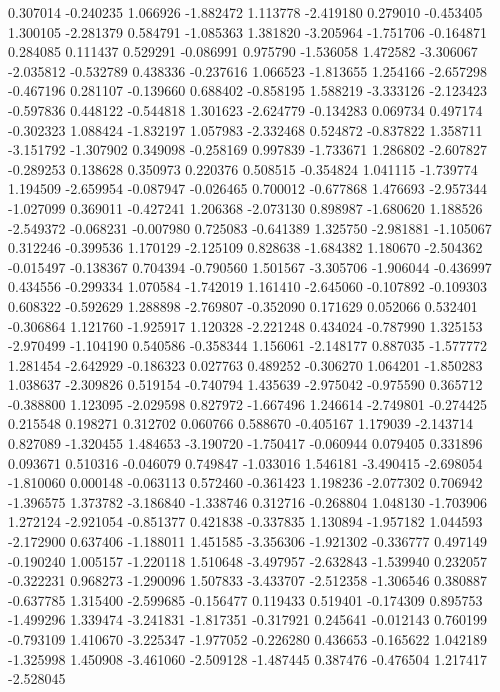 0.307014
-0.240235
1.066926
-1.882472
1.113778
-2.419180
0.279010
-0.453405
1.300105
-2.281379
0.584791
-1.085363
1.381820
-3.205964
-1.751706
-0.164871
0.284085
0.111437
0.529291
-0.086991
0.975790
-1.536058
1.472582
-3.306067
-2.035812
-0.532789
0.438336
-0.237616
1.066523
-1.813655
1.254166
-2.657298
-0.467196
0.281107
-0.139660
0.688402
-0.858195
1.588219
-3.333126
-2.123423
-0.597836
0.448122
-0.544818
1.301623
-2.624779
-0.134283
0.069734
0.497174
-0.302323
1.088424
-1.832197
1.057983
-2.332468
0.524872
-0.837822
1.358711
-3.151792
-1.307902
0.349098
-0.258169
0.997839
-1.733671
1.286802
-2.607827
-0.289253
0.138628
0.350973
0.220376
0.508515
-0.354824
1.041115
-1.739774
1.194509
-2.659954
-0.087947
-0.026465
0.700012
-0.677868
1.476693
-2.957344
-1.027099
0.369011
-0.427241
1.206368
-2.073130
0.898987
-1.680620
1.188526
-2.549372
-0.068231
-0.007980
0.725083
-0.641389
1.325750
-2.981881
-1.105067
0.312246
-0.399536
1.170129
-2.125109
0.828638
-1.684382
1.180670
-2.504362
-0.015497
-0.138367
0.704394
-0.790560
1.501567
-3.305706
-1.906044
-0.436997
0.434556
-0.299334
1.070584
-1.742019
1.161410
-2.645060
-0.107892
-0.109303
0.608322
-0.592629
1.288898
-2.769807
-0.352090
0.171629
0.052066
0.532401
-0.306864
1.121760
-1.925917
1.120328
-2.221248
0.434024
-0.787990
1.325153
-2.970499
-1.104190
0.540586
-0.358344
1.156061
-2.148177
0.887035
-1.577772
1.281454
-2.642929
-0.186323
0.027763
0.489252
-0.306270
1.064201
-1.850283
1.038637
-2.309826
0.519154
-0.740794
1.435639
-2.975042
-0.975590
0.365712
-0.388800
1.123095
-2.029598
0.827972
-1.667496
1.246614
-2.749801
-0.274425
0.215548
0.198271
0.312702
0.060766
0.588670
-0.405167
1.179039
-2.143714
0.827089
-1.320455
1.484653
-3.190720
-1.750417
-0.060944
0.079405
0.331896
0.093671
0.510316
-0.046079
0.749847
-1.033016
1.546181
-3.490415
-2.698054
-1.810060
0.000148
-0.063113
0.572460
-0.361423
1.198236
-2.077302
0.706942
-1.396575
1.373782
-3.186840
-1.338746
0.312716
-0.268804
1.048130
-1.703906
1.272124
-2.921054
-0.851377
0.421838
-0.337835
1.130894
-1.957182
1.044593
-2.172900
0.637406
-1.188011
1.451585
-3.356306
-1.921302
-0.336777
0.497149
-0.190240
1.005157
-1.220118
1.510648
-3.497957
-2.632843
-1.539940
0.232057
-0.322231
0.968273
-1.290096
1.507833
-3.433707
-2.512358
-1.306546
0.380887
-0.637785
1.315400
-2.599685
-0.156477
0.119433
0.519401
-0.174309
0.895753
-1.499296
1.339474
-3.241831
-1.817351
-0.317921
0.245641
-0.012143
0.760199
-0.793109
1.410670
-3.225347
-1.977052
-0.226280
0.436653
-0.165622
1.042189
-1.325998
1.450908
-3.461060
-2.509128
-1.487445
0.387476
-0.476504
1.217417
-2.528045
